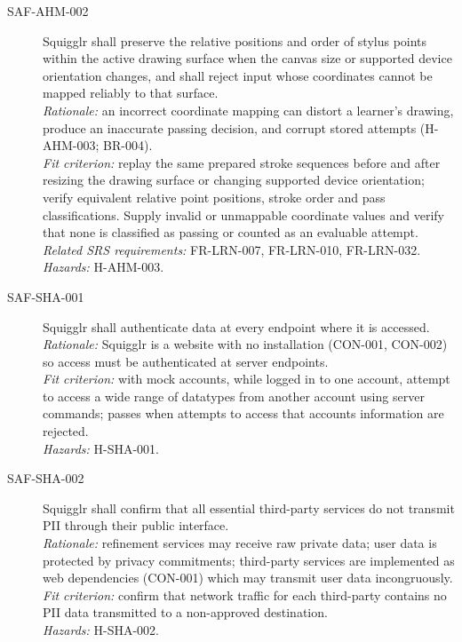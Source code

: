 \documentclass[12pt]{article}
\renewcommand{\_}{\textunderscore\allowbreak}%
\begin{document}
\begin{description}
\item[SAF-AHM-002]\label{req:SAF-AHM-002} Squigglr shall preserve
the relative positions and order of stylus points within the active drawing
surface when the canvas size or supported device orientation changes, and shall
reject input whose coordinates cannot be mapped reliably to that surface.\\
\emph{Rationale:} an incorrect coordinate mapping can distort a learner's
drawing, produce an inaccurate passing decision, and corrupt stored attempts
(H-AHM-003; BR-004).\\
\emph{Fit criterion:} replay the same prepared stroke sequences before and after
resizing the drawing surface or changing supported device orientation; verify
equivalent relative point positions, stroke order and pass classifications.
Supply invalid or unmappable coordinate values and verify that none is
classified as passing or counted as an evaluable attempt.\\
\emph{Related SRS requirements:} FR-LRN-007, FR-LRN-010, FR-LRN-032.\\
\emph{Hazards:} H-AHM-003.

\item[SAF-SHA-001]\label{req:SAF-SHA-001} Squigglr shall
authenticate data at every endpoint where it is accessed.\\
\emph{Rationale:} Squigglr is a website with no installation (CON-001, CON-002)
so access must be authenticated at server endpoints.\\
\emph{Fit criterion:} with mock accounts, while logged in to one account,
attempt to access a wide range of datatypes from another account using server
commands; passes when attempts to access that accounts information are rejected.
\\
\emph{Hazards:} H-SHA-001.

\item[SAF-SHA-002]\label{req:SAF-SHA-002} Squigglr shall confirm
that all essential third-party services do not transmit PII through their public
interface.\\
\emph{Rationale:} refinement services may receive raw private data; user data is
protected by privacy commitments; third-party services are implemented as web
dependencies (CON-001) which may transmit user data incongruously.\\
\emph{Fit criterion:} confirm that network traffic for each third-party contains
no PII data transmitted to a non-approved destination.\\
\emph{Hazards:} H-SHA-002.


\end{description}
\end{document}

